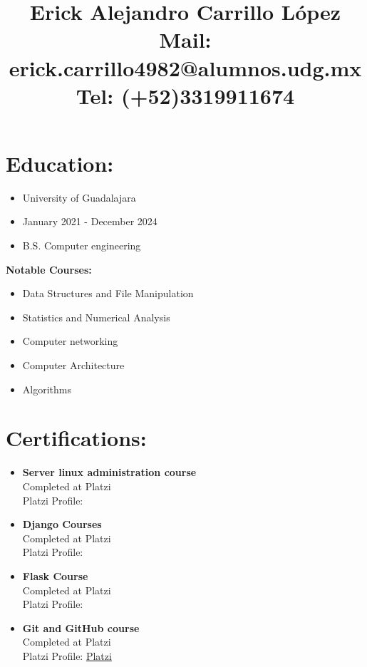\documentclass{article}
\title{\textbf{Erick Alejandro Carrillo López} \\
\textbf{Mail:} erick.carrillo4982@alumnos.udg.mx\\
\textbf{Tel:} (+52)3319911674
\quad\quad \href{https://github.com/alecksandr26}{\color{Blue}{Github}}
\quad\quad \href{https://www.linkedin.com/in/erick-alejandro-carrillo-lopez-988112219/}{\color{Blue}{Linkedin}}
}
\date{}
\begin{document}
\maketitle

\begin{minipage}[t]{8cm}
\vspace*{-2cm}
\section*{Education:}
\begin{itemize}
  \setlength\itemsep{0.01cm}
\item University of Guadalajara
\item January 2021 - December 2024
\item B.S. Computer engineering
\end{itemize}
\textbf{Notable Courses:}
\begin{itemize}
  \setlength\itemsep{0.01cm}
\item Data Structures and File Manipulation
\item Statistics and Numerical Analysis
\item Computer networking
\item Computer Architecture
\item Algorithms
\end{itemize}

\section*{Certifications:}
\begin{itemize}
  \setlength\itemsep{0.01cm}
\item \textbf{Server linux administration course}\\
  Completed at Platzi\\
  Platzi Profile: \href{https://platzi.com/p/windowsky/}{\color{Blue}{Platzi}}
\item \textbf{Django Courses}\\
  Completed at Platzi\\
  Platzi Profile: \href{https://platzi.com/p/windowsky/}{\color{Blue}{Platzi}}
\item \textbf{Flask Course}\\
  Completed at Platzi\\
  Platzi Profile: \href{https://platzi.com/p/windowsky/}{\color{Blue}{Platzi}}
\item \textbf{Git and GitHub course}\\
  Completed at Platzi\\
  Platzi Profile: \href{https://platzi.com/p/windowsky/}{Platzi}
  

\end{itemize}
\end{minipage}
\end{document}
